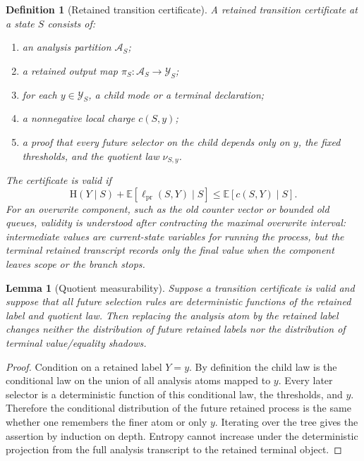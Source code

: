 \documentclass[11pt]{article}
\newtheorem{lemma}[theorem]{Lemma}
\newtheorem{definition}[theorem]{Definition}
\theoremstyle{remark}
\newcommand{\E}{\mathbb E}
\newcommand{\HH}{\mathrm H}
\newcommand{\pr}{\mathrm{pr}}
\begin{document}
\begin{definition}[Retained transition certificate]\label{def:rtc}
A retained transition certificate at a state $S$ consists of:
\begin{enumerate}[label=\textup{(\roman*)}]
\item an analysis partition $\mathcal A_S$;
\item a retained output map $\pi_S:\mathcal A_S\to\mathcal Y_S$;
\item for each $y\in\mathcal Y_S$, a child mode or a terminal declaration;
\item a nonnegative local charge $c(S,y)$;
\item a proof that every future selector on the child depends only on $y$, the fixed thresholds, and the quotient law $\nu_{S,y}$.
\end{enumerate}
The certificate is valid if
\[
        \HH(Y\mid S)+\E[\ell_{\pr}(S,Y)\mid S]\le \E[c(S,Y)\mid S].
\]
For an overwrite component, such as the old counter vector or bounded old queues, validity is understood after contracting the maximal overwrite interval: intermediate values are current-state variables for running the process, but the terminal retained transcript records only the final value when the component leaves scope or the branch stops.
\end{definition}

\begin{lemma}[Quotient measurability]\label{lem:quotient-meas-app}
Suppose a transition certificate is valid and suppose that all future selection rules are deterministic functions of the retained label and quotient law.  Then replacing the analysis atom by the retained label changes neither the distribution of future retained labels nor the distribution of terminal value/equality shadows.
\end{lemma}

\begin{proof}
Condition on a retained label $Y=y$.  By definition the child law is the conditional law on the union of all analysis atoms mapped to $y$.  Every later selector is a deterministic function of this conditional law, the thresholds, and $y$.  Therefore the conditional distribution of the future retained process is the same whether one remembers the finer atom or only $y$.  Iterating over the tree gives the assertion by induction on depth.  Entropy cannot increase under the deterministic projection from the full analysis transcript to the retained terminal object.
\end{proof}
\end{document}
